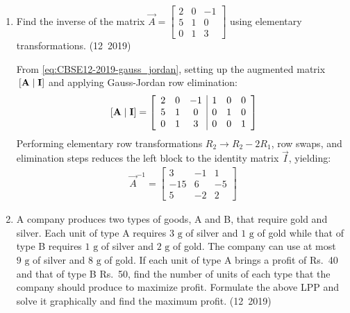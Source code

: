 \begin{enumerate}[label=\thesubsection.\arabic*, ref=\thesubsection.\theenumi]
\item Find the inverse of the matrix $\vec{A} = \begin{bmatrix} 2 & 0 & -1 \\ 5 & 1 & 0 \\ 0 & 1 & 3 \end{bmatrix}$ using elementary transformations.
\hfill (12~2019)

\solution
From \eqref{eq:CBSE12-2019-gauss_jordan}, setting up the augmented matrix ${}\left[\mathbf{A} \mid \mathbf{I}\right]$ and applying Gauss-Jordan row elimination:
\begin{align}
	{}\left[\mathbf{A} \mid \mathbf{I}\right] = \left[\begin{array}{ccc|ccc} 2 & 0 & -1 & 1 & 0 & 0 \\ 5 & 1 & 0 & 0 & 1 & 0 \\ 0 & 1 & 3 & 0 & 0 & 1 \end{array}\right]
\end{align}
Performing elementary row transformations $R_2 \to R_2 - 2R_1$, row swaps, and elimination steps reduces the left block to the identity matrix $\vec{I}$, yielding:
\begin{align}
	\vec{A}^{-1} = \begin{bmatrix}
		3 & -1 & 1 \\
		-15 & 6 & -5 \\
		5 & -2 & 2
	\end{bmatrix}
\end{align}


\item A company produces two types of goods, A and B, that require gold and silver. Each unit of type A requires $3\text{ g}$ of silver and $1\text{ g}$ of gold while that of type B requires $1\text{ g}$ of silver and $2\text{ g}$ of gold. The company can use at most $9\text{ g}$ of silver and $8\text{ g}$ of gold. If each unit of type A brings a profit of Rs.~40 and that of type B Rs.~50, find the number of units of each type that the company should produce to maximize profit. Formulate the above LPP and solve it graphically and find the maximum profit.
\hfill (12~2019)


\end{enumerate}
